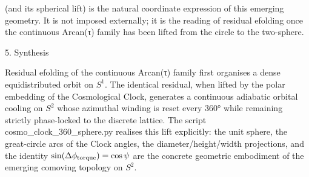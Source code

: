 (and its spherical lift) is the natural coordinate expression of this emerging geometry. It is not imposed externally; it is the reading of residual efolding once the continuous Arcan(τ) family has been lifted from the circle to the two-sphere.

5. Synthesis

Residual efolding of the continuous Arcan(τ) family first organises a dense equidistributed orbit on \(S^1\). The identical residual, when lifted by the polar embedding of the Cosmological Clock, generates a continuous adiabatic orbital cooling on \(S^2\) whose azimuthal winding is reset every 360° while remaining strictly phase-locked to the discrete lattice. The script cosmo_clock_360_sphere.py realises this lift explicitly: the unit sphere, the great-circle arcs of the Clock angles, the diameter/height/width projections, and the identity \(\sin(\Delta\phi_{\rm torque})=\cos\psi\) are the concrete geometric embodiment of the emerging comoving topology on \(S^2\).
